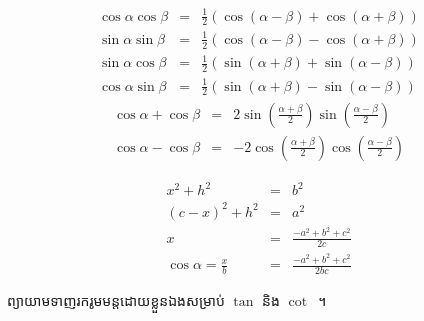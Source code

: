 \documentclass[fleqn,leqno,a4paper,11pt]{article}
\begin{document}
\par\noindent
\begin{minipage}{0.54\textwidth}
\begin{eqnarray}
\cos\alpha\cos\beta&=&\frac{1}{2}(\cos(\alpha-\beta)+\cos(\alpha+\beta))\\
\sin\alpha\sin\beta&=&\frac{1}{2}(\cos(\alpha-\beta)-\cos(\alpha+\beta))\\
\sin\alpha\cos\beta&=&\frac{1}{2}(\sin(\alpha+\beta)+\sin(\alpha-\beta))\\
\cos\alpha\sin\beta&=&\frac{1}{2}(\sin(\alpha+\beta)-\sin(\alpha-\beta))
\end{eqnarray}
\begin{eqnarray}
\cos\alpha+\cos\beta&=&2\sin(\frac{\alpha+\beta}{2})\sin(\frac{\alpha-\beta}{2})\\
\cos\alpha-\cos\beta&=&-2\cos(\frac{\alpha+\beta}{2})\cos(\frac{\alpha-\beta}{2})
\end{eqnarray}
\end{minipage}
\begin{minipage}{0.45\textwidth}
\begin{eqnarray*}
x^2+h^2&=&b^2\\
(c-x)^2+h^2&=&a^2\\
x&=&\frac{-a^2+b^2+c^2}{2c}\\
\cos\alpha=\frac{x}{b}&=&\frac{-a^2+b^2+c^2}{2bc}
\end{eqnarray*}
\end{minipage}
\par\noindent ព្យាយាមទាញរករូមមន្តដោយខ្លួនឯងសម្រាប់ $ \tan $ និង $ \cot $~។
\end{document}
